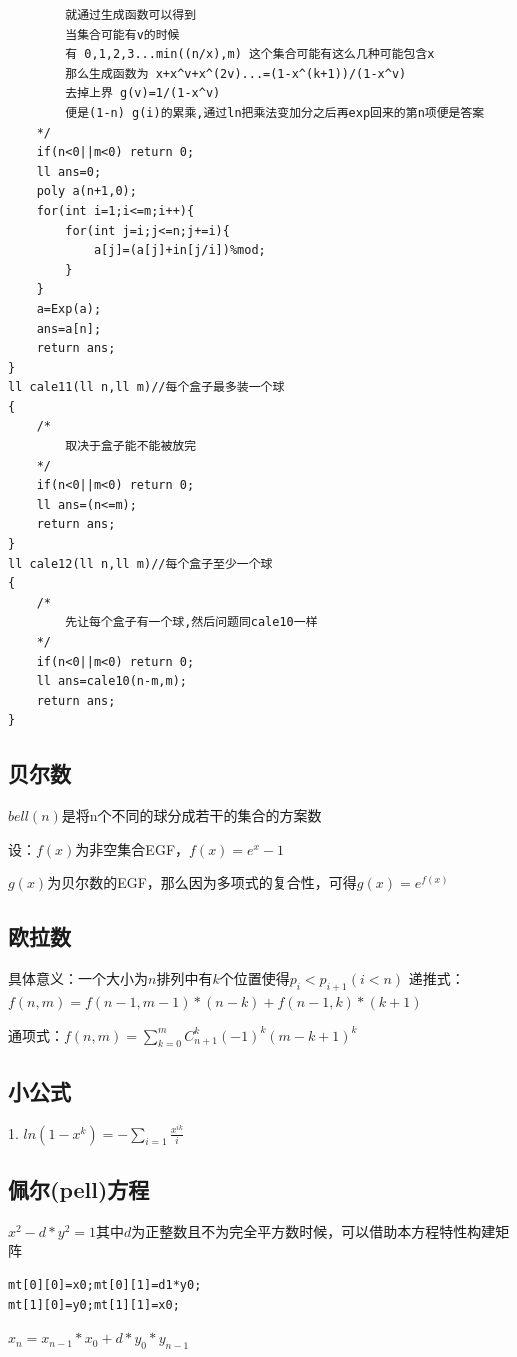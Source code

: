 \documentclass[12pt, a4paper, oneside]{ctexart}
\begin{document}
\begin{lstlisting}
        就通过生成函数可以得到
        当集合可能有v的时候
        有 0,1,2,3...min((n/x),m) 这个集合可能有这么几种可能包含x
        那么生成函数为 x+x^v+x^(2v)...=(1-x^(k+1))/(1-x^v)
        去掉上界 g(v)=1/(1-x^v)
        便是(1-n) g(i)的累乘,通过ln把乘法变加分之后再exp回来的第n项便是答案
    */
    if(n<0||m<0) return 0;
    ll ans=0;
    poly a(n+1,0);
    for(int i=1;i<=m;i++){
        for(int j=i;j<=n;j+=i){
            a[j]=(a[j]+in[j/i])%mod;
        }
    }
    a=Exp(a);
    ans=a[n];
    return ans;
}
ll cale11(ll n,ll m)//每个盒子最多装一个球
{
    /*
        取决于盒子能不能被放完
    */
    if(n<0||m<0) return 0;
    ll ans=(n<=m);
    return ans;
}
ll cale12(ll n,ll m)//每个盒子至少一个球
{
    /*
        先让每个盒子有一个球,然后问题同cale10一样
    */
    if(n<0||m<0) return 0;
    ll ans=cale10(n-m,m);
    return ans;
}
\end{lstlisting}

\newpage 
\subsection{贝尔数} 
${bell(n)}$是将n个不同的球分成若干的集合的方案数

设：${f(x)}$为非空集合EGF，${f(x)=e^x-1}$

​       ${g(x)}$为贝尔数的EGF，那么因为多项式的复合性，可得${g(x)=e^{f(x)}}$

\subsection{欧拉数} 
具体意义：一个大小为${n}$排列中有${k}$个位置使得${p_i<p_{i+1}(i<n)}$ 
递推式：${f(n,m)=f(n-1,m-1)*(n-k)+f(n-1,k)*(k+1)}$

通项式：${f(n,m)={\sum_{k=0}^m}{C_{n+1}^k}(-1)^k(m-k+1)^k}$

\subsection{小公式}
1. ${ln(1-x^k)=-{\sum_{i=1}}{\frac{x^{ik}}{i}}}$

\subsection{佩尔(pell)方程} 
${x^2-d*y^2=1}$其中${d}$为正整数且不为完全平方数时候，可以借助本方程特性构建矩阵
\begin{lstlisting}
mt[0][0]=x0;mt[0][1]=d1*y0;
mt[1][0]=y0;mt[1][1]=x0;
\end{lstlisting}
${x_n=x_{n-1}*x_0+d*y_0*y_{n-1}}$
\end{document}
